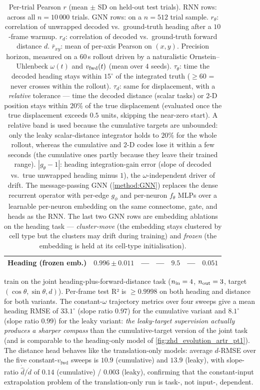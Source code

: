 \documentclass[11pt]{article}
\begin{document}
\begin{table}[H]
{\begin{tabular}{l c c c c c c}
Heading (frozen emb.)        & $0.996 \pm 0.011$ & ---               & ---               & $9.5$    & ---      & $0.051$ \\
\bottomrule
\end{tabular}}
\caption{Per-trial Pearson $r$ (mean $\pm$ SD on held-out test trials). RNN rows: across all $n=10\,000$ trials. GNN rows:
on a $n=512$ trial sample. $r_\theta$: correlation of unwrapped decoded
vs.\ ground-truth heading after a $10$-frame warmup. $r_d$: correlation
of decoded vs.\ ground-truth forward distance $d$. $\bar r_{xy}$: mean
of per-axis Pearson on $(x,y)$. Precision horizon, measured on a $60\,$s rollout
driven by a naturalistic Ornstein--Uhlenbeck $\omega(t)$ and $v_{\rm
fwd}(t)$ (mean over $4$ seeds). $\tau_\theta$: time the decoded heading
stays within $15^\circ$ of the integrated truth ($\ge 60$ = never crosses
within the rollout). $\tau_d$: same for displacement, with a \emph{relative} tolerance --- time
the decoded distance (scalar tasks) or $2$-D position stays within $20\%$
of the true displacement (evaluated once the true displacement exceeds
$0.5$ units, skipping the near-zero start). A relative band is used because
the cumulative targets are unbounded: only the leaky scalar-distance
integrator holds to $20\%$ for the whole rollout, whereas the cumulative
and $2$-D codes lose it within a few seconds (the cumulative ones partly
because they leave their trained range).
$|g_\theta\!-\!1|$: heading integration-gain error (slope of decoded vs.\
true unwrapped heading minus $1$), the $\omega$-independent driver of
drift. The message-passing GNN (\cref{method:GNN}) replaces the dense
recurrent operator with per-edge $g_\phi$ and per-neuron $f_\theta$ MLPs
over a learnable per-neuron embedding on the same connectome, gate, and
heads as the RNN. The last two GNN rows are embedding ablations on the
heading task --- \emph{cluster-move} (the embedding stays clustered by cell
type but the clusters may drift during training) and \emph{frozen} (the
embedding is held at its cell-type initialisation).}
\label{tab:zhd_subtask_metrics}
\end{table}

 train on
the joint heading-plus-forward-distance task
($n_{\rm in}=4$, $n_{\rm out}=3$, target $(\cos\theta,\sin\theta,d)$).
Per-frame test R² is $\ge 0.9998$ on both heading and distance for
both variants. The constant-$\omega$ trajectory metrics over four
sweeps give a mean heading RMSE of $33.1^\circ$ (slope ratio $0.97$)
for the cumulative variant and $8.1^\circ$ (slope ratio $0.99$) for the
leaky variant: \emph{the leaky-target supervision actually produces
a sharper compass} than the cumulative-target version of the joint task
(and is comparable to the heading-only model of
\cref{fig:zhd_evolution_artr_pt1}). The distance head behaves
like the translation-only models: average $d$-RMSE over the five
constant-$v_{\mathrm{fwd}}$ sweeps is $10.9$ (cumulative) and $13.9$
(leaky), with slope-ratio $\dot{\hat d}/\dot d$ of $0.14$ (cumulative)
/ $0.003$ (leaky), confirming that the constant-input extrapolation
problem of the translation-only run is task-, not input-, dependent.
\end{document}
